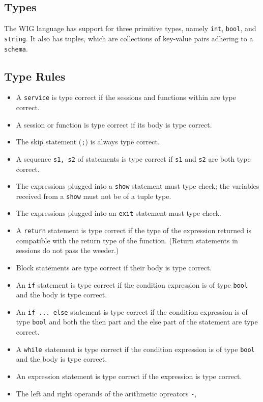 \documentclass{WigReport}
\begin{document}
\subsection{Types}
The WIG language has support for three primitive types, namely {\tt int},
{\tt bool}, and {\tt string}. It also has tuples, which are collections
of key-value pairs adhering to a {\tt schema}.

\subsection{Type Rules}
\begin{itemize}
\item A {\tt service} is type correct if the sessions and functions within
      are type correct.
\item A session or function is type correct if its body is type correct.
\item The skip statement ({\tt ;}) is always type correct.
\item A sequence {\tt s1, s2} of statements is type correct if {\tt s1} and 
{\tt s2} are both type correct.  
\item The expressions plugged into a {\tt show} statement must type check; 
the variables received from a {\tt show} must not be of a tuple type.
\item The expressions plugged into an {\tt exit} statement must type check. 
\item A {\tt return} statement is type correct if the type of the 
      expression returned is compatible with the return type of the 
      function. (Return statements in sessions do not pass the weeder.)
\item Block statements are type correct if their body is type correct.
\item An {\tt if} statement is type correct if the condition expression is
      of type {\tt bool} and the body is type correct.
\item An {\tt if ... else} statement is type correct if the condition 
      expression is of type {\tt bool} and both the then part and the else 
      part of the statement are type correct.
\item A {\tt while} statement is type correct if the condition expression 
      is of type {\tt bool} and the body is type correct.
\item An expression statement is type correct if the expression is type 
      correct.
\item The left and right operands of the arithmetic opreators {\tt -},

\end{itemize}
\end{document}
